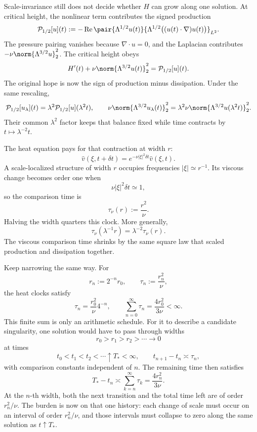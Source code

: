 
Scale-invariance still does not decide whether \(H\) can grow along one solution. At critical height, the nonlinear term contributes the signed production
\[
  \mathcal P_{1/2}[u](t)
  :=
  -\operatorname{Re}
  \pair
    {\Lambda^{1/2}u(t)}
    {\Lambda^{1/2}\bigl((u(t)\cdot\nabla)u(t)\bigr)}_{L^2}.
\]
The pressure pairing vanishes because \(\nabla\cdot u=0\), and the Laplacian contributes \(-\nu\norm{\Lambda^{3/2}u}_2^2\). The critical height obeys
\[
  H'(t)
  +
  \nu\norm{\Lambda^{3/2}u(t)}_2^2
  =
  \mathcal P_{1/2}[u](t).
\]
The original hope is now the sign of production minus dissipation. Under the same rescaling,
\[
  \mathcal P_{1/2}[u_\lambda](t)
  =
  \lambda^2\mathcal P_{1/2}[u](\lambda^2t),
  \qquad
  \nu\norm{\Lambda^{3/2}u_\lambda(t)}_2^2
  =
  \lambda^2\nu\norm{\Lambda^{3/2}u(\lambda^2t)}_2^2.
\]
Their common \(\lambda^2\) factor keeps that balance fixed while time contracts by \(t\mapsto\lambda^{-2}t\).


The heat equation pays for that contraction at width \(r\):
\[
  \widehat v(\xi,t+\delta t)
  =
  e^{-\nu|\xi|^2\delta t}\widehat v(\xi,t).
\]
A scale-localized structure of width \(r\) occupies frequencies \(|\xi|\simeq r^{-1}\). Its viscous change becomes order one when
\[
  \nu|\xi|^2\delta t\simeq1,
\]
so the comparison time is
\[
  \tau_\nu(r)
  :=
  \frac{r^2}{\nu}.
\]
Halving the width quarters this clock. More generally,
\[
  \tau_\nu(\lambda^{-1}r)
  =
  \lambda^{-2}\tau_\nu(r).
\]
The viscous comparison time shrinks by the same square law that scaled production and dissipation together.


Keep narrowing the same way. For
\[
  r_n:=2^{-n}r_0,
  \qquad
  \tau_n:=\frac{r_n^2}{\nu},
\]
the heat clocks satisfy
\[
  \tau_n
  =
  \frac{r_0^2}{\nu}4^{-n},
  \qquad
  \sum_{n=0}^{\infty}\tau_n
  =
  \frac{4r_0^2}{3\nu}
  <
  \infty.
\]
This finite sum is only an arithmetic schedule. For it to describe a candidate singularity, one \NavierStokes{} solution would have to pass through widths
\[
  r_0>r_1>r_2>\cdots\longrightarrow0
\]
at times
\[
  t_0<t_1<t_2<\cdots\uparrow T_*<\infty,
  \qquad
  t_{n+1}-t_n\asymp\tau_n,
\]
with comparison constants independent of \(n\). The remaining time then satisfies
\[
  T_*-t_n
  \asymp
  \sum_{k=n}^{\infty}\tau_k
  =
  \frac{4r_n^2}{3\nu}.
\]
At the \(n\)-th width, both the next transition and the total time left are of order \(r_n^2/\nu\). The burden is now on that one history: each change of scale must occur on an interval of order \(r_n^2/\nu\), and those intervals must collapse to zero along the same solution as \(t\uparrow T_*\).

